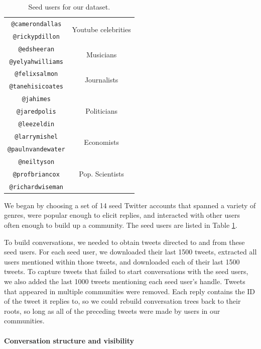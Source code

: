 \documentclass[11pt,letterpaper]{article}
\begin{document}
\begin{table}
\begin{center}
\begin{tabular}{|c|c|}
\hline
{\tt @camerondallas} & \multirow{2}{*}{Youtube celebrities} \\
{\tt @rickypdillon} & \\
\hline
{\tt @edsheeran} & \multirow{2}{*}{Musicians} \\
{\tt @yelyahwilliams} & \\
\hline
{\tt @felixsalmon} & \multirow{2}{*}{Journalists} \\
{\tt @tanehisicoates} & \\
\hline
{\tt @jahimes} & \multirow{3}{*}{Politicians} \\
{\tt @jaredpolis} & \\
{\tt @leezeldin} & \\
\hline
{\tt @larrymishel} & \multirow{2}{*}{Economists} \\
{\tt @paulnvandewater} & \\
\hline
{\tt @neiltyson} & \multirow{3}{*}{Pop. Scientists} \\
{\tt @profbriancox} & \\
{\tt @richardwiseman} & \\
\hline
\end{tabular}
\end{center}
\caption{\label{tab:seed-users} Seed users for our dataset.}
\end{table}

We began by choosing a set of 14 seed Twitter accounts that spanned a variety of genres, were popular enough to elicit replies, and interacted with other users often enough to build up a community.  The seed users are listed in Table \ref{tab:seed-users}.  

To build conversations, we needed to obtain tweets directed to and from these seed users. For each seed user, we downloaded their last 1500 tweets, extracted all users mentioned within those tweets, and downloaded each of their last 1500 tweets.  To capture tweets that failed to start conversations with the seed users, we also added the last 1000 tweets mentioning each seed user's handle.  Tweets that appeared in multiple communities were removed.  Each reply contains the ID of the tweet it replies to, so we could rebuild conversation trees back to their roots, so long as all of the preceding tweets were made by users in our communities.

\paragraph{Conversation structure and visibility}
\end{document}
